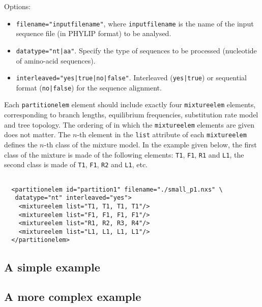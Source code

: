 \documentclass[a4paper,12pt]{article}
\newcommand{\x}[1]{\texttt{#1}}
\begin{document}
Options:
\begin{itemize}
\item \x{filename="inputfilename"}, where \x{inputfilename} is the name of the input sequence file
  (in PHYLIP format) to be analysed.
\item \x{datatype="nt|aa"}. Specify the type of sequences to be processed (nucleotide of amino-acid sequences).
\item \x{interleaved="yes|true|no|false"}. Interleaved (\x{yes|true}) or sequential format
  (\x{no|false}) for the sequence alignment.
\end{itemize}

Each \x{partitionelem} element should include exactly four \x{mixtureelem} elements, corresponding to
branch lengths, equilibrium frequencies, substitution rate model and tree topology. The ordering of
in which the \x{mixtureelem} elements are given does not matter. The $n$-th element in the \x{list}
attribute of each \x{mixtureelem} defines the $n$-th class of the mixture model. In the example given
below, the first class of the mixture is made of the following elements: \x{T1}, \x{F1}, \x{R1} and
\x{L1}, the second class is made of \x{T1}, \x{F1}, \x{R2} and \x{L1}, etc.


\vspace{0.2cm}
\begin{Verbatim}[frame=single, label=Example of `partitionelem' tag, samepage=true, baselinestretch=0.5]

  <partitionelem id="partition1" filename="./small_p1.nxs" \
   datatype="nt" interleaved="yes">
    <mixtureelem list="T1, T1, T1, T1"/>
    <mixtureelem list="F1, F1, F1, F1"/>
    <mixtureelem list="R1, R2, R3, R4"/>
    <mixtureelem list="L1, L1, L1, L1"/>
  </partitionelem>

\end{Verbatim}

\subsection{A simple example}

\subsection{A more complex example}
\end{document}
